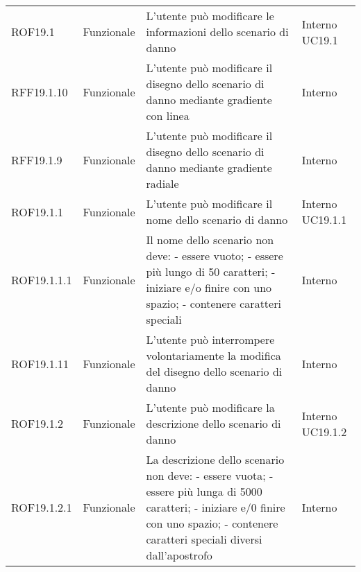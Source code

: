 \begin{longtable}{p{2cm}!{\VRule[1pt]}p{2cm}!{\VRule[1pt]}p{5cm}!{\VRule[1pt]}p{1.5cm}}
	\\
	ROF19.1                          & Funzionale\newline               & L'utente può modificare le informazioni dello scenario di danno                                                          & Interno \newline UC19.1      
	\\
	RFF19.1.10                       & Funzionale\newline               & L'utente può modificare il disegno dello scenario di danno mediante gradiente con linea                                  & Interno                      \\
	RFF19.1.9                        & Funzionale\newline               & L'utente può modificare il disegno dello scenario di danno mediante gradiente radiale                                    & Interno                      \\
	ROF19.1.1                        & Funzionale\newline               & L'utente può modificare il nome dello scenario di danno                                                                  & Interno \newline UC19.1.1    
	\\
	ROF19.1.1.1&Funzionale\newline  & Il nome dello scenario non deve:
	- essere vuoto; 
	- essere più lungo di 50 caratteri; 
	- iniziare e/o finire con uno spazio;
	- contenere caratteri speciali & Interno \\
	ROF19.1.11                       & Funzionale\newline               & L'utente può interrompere volontariamente la modifica del disegno dello scenario di danno                                & Interno                      \\
	ROF19.1.2                        & Funzionale\newline               & L'utente può modificare la descrizione dello scenario di danno                                                           & Interno \newline UC19.1.2    
	\\
	ROF19.1.2.1&Funzionale\newline  & La descrizione dello scenario non deve:
	- essere vuota;
	- essere più lunga di 5000 caratteri;
	- iniziare e/0 finire con uno spazio; 
	- contenere caratteri speciali diversi dall'apostrofo & Interno \\

\end{longtable}
